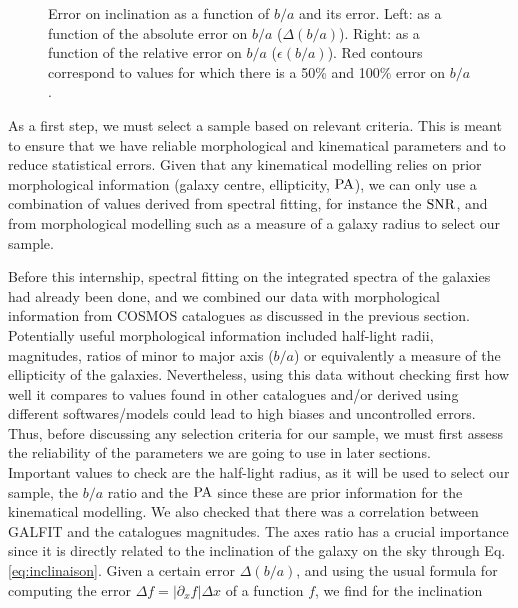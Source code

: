 \begin{figure}[H]
\begin{minipage}[c]{0.49\linewidth}
	\end{minipage}
	\caption[Error on inclination as a function of $b/a$ and its error.]{Error on inclination as a function of $b/a$ and its error. Left: as a function of the absolute error on $b/a$ ($\Delta (b/a)$). Right: as a function of the relative error on $b/a$ ($\epsilon ( b/a)$). Red contours correspond to values for which there is a 50\% and 100\% error on $b/a$.}
	\label{fig:erreur_inclinaison}
\end{figure}

As a first step, we must select a sample based on relevant criteria. This is meant to ensure that we have reliable morphological and kinematical parameters and to reduce statistical errors. Given that any kinematical modelling relies on prior morphological information (galaxy centre, ellipticity, $\rm{PA}$), we can only use a combination of values derived from spectral fitting, for instance the $\rm{SNR}$, and from morphological modelling such as a measure of a galaxy radius to select our sample.  

Before this internship, spectral fitting on the integrated spectra of the galaxies had already been done, and we combined our data with morphological information from COSMOS catalogues as discussed in the previous section. Potentially useful morphological information included half-light radii, magnitudes, ratios of minor to major axis ($b/a$) or equivalently a measure of the ellipticity of the galaxies. Nevertheless, using this data without checking first how well it compares to values found in other catalogues and/or derived using different softwares/models could lead to high biases and uncontrolled errors. Thus, before discussing any selection criteria for our sample, we must first assess the reliability of the parameters we are going to use in later sections. \\

Important values to check are the half-light radius, as it will be used to select our sample, the $b/a$ ratio and the $\rm{PA}$ since these are prior information for the kinematical modelling. We also checked that there was a correlation between GALFIT and the catalogues magnitudes. The axes ratio has a crucial importance since it is directly related to the inclination of the galaxy on the sky through Eq.\,\ref{eq:inclinaison}. Given a certain error $\Delta (b/a)$, and using the usual formula for computing the error $\Delta f = | \partial_x f | \Delta x$ of a function $f$, we find for the inclination


